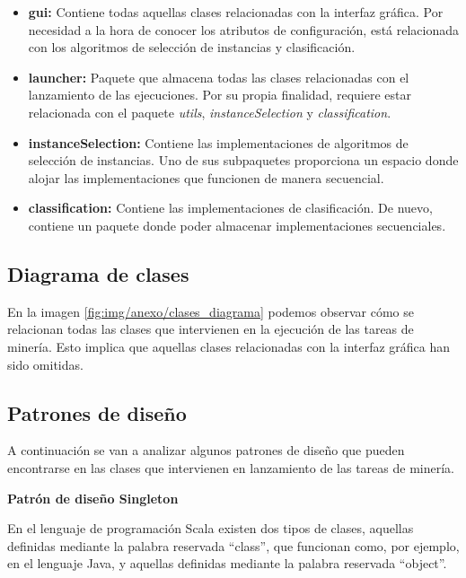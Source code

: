 
\begin{itemize}
\item \textbf{gui:} Contiene todas aquellas clases relacionadas con la interfaz gráfica. Por necesidad a la hora de conocer los atributos de configuración, está relacionada con los algoritmos de selección de instancias y clasificación.
\item \textbf{launcher:} Paquete que almacena todas las clases relacionadas con el lanzamiento de las ejecuciones. Por su propia finalidad, requiere estar relacionada con el paquete \textit{utils}, \textit{instanceSelection} y \textit{classification}.
\item \textbf{instanceSelection:} Contiene las implementaciones de algoritmos de selección de instancias. Uno de sus subpaquetes proporciona un espacio donde alojar las implementaciones que funcionen de manera secuencial.
\item \textbf{classification:} Contiene las implementaciones de clasificación. De nuevo, contiene un paquete donde poder almacenar implementaciones secuenciales.
\end{itemize}

\subsection{Diagrama de clases}

En la imagen \ref{fig:img/anexo/clases_diagrama} podemos observar cómo se relacionan todas las clases que intervienen en la ejecución de las tareas de minería. Esto implica que aquellas clases relacionadas con la interfaz gráfica han sido omitidas.



\subsection{Patrones de diseño}

A continuación se van a analizar algunos patrones de diseño que pueden encontrarse en las clases que intervienen en lanzamiento de las tareas de minería.

\textbf{Patrón de diseño Singleton}

En el lenguaje de programación Scala existen dos tipos de clases, aquellas definidas mediante la palabra reservada ``class'', que funcionan como, por ejemplo, en el lenguaje Java, y aquellas definidas mediante la palabra reservada ``object''.

